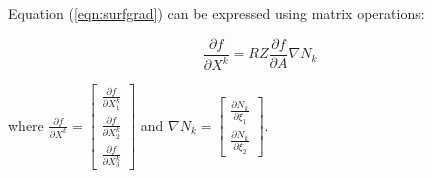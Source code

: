 \documentclass{report}
\begin{document}
\noindent Equation (\ref{eqn:surfgrad}) can be expressed using matrix operations:

\begin{equation}
\frac{\partial f}{\partial X^k} = R Z \frac{\partial f}{\partial A} \nabla N_k
\end{equation}

where $\frac{\partial f}{\partial X^k} = \left[ \begin{array}{c} 
\frac{\partial f}{\partial X^k_1} \\
\frac{\partial f}{\partial X^k_2} \\
\frac{\partial f}{\partial X^k_3} \end{array} \right]$
and $\nabla N_k = \left[ \begin{array}{c} 
\frac{\partial N_k}{\partial \xi_1} \\
\frac{\partial N_k}{\partial \xi_2} \end{array} \right]$.
\end{document}
